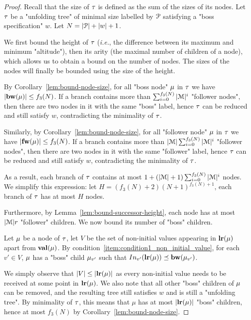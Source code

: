 \begin{proof}
	Recall that the size of $\tau$ is defined as the sum of the sizes of its nodes. 
	Let $\tau$ be a "unfolding tree" of minimal size labelled by $\mathcal{P}$ satisfying a "boss specification" $w$. Let $N = |\mathcal{P}| + |w|+1$.
	
	We first bound the height of $\tau$ (\emph{i.e.}, the difference between its maximum and minimum "altitude"), then its arity (the maximal number of children of a node), which allows us to obtain a bound on the number of nodes. The sizes of the nodes will finally be bounded using the size of the height. 
	
	By Corollary~\ref{lem:bound-node-size}, for all "boss node" $\mu$ in $\tau$ we have $|\mathbf{bw}(\mu)| \leq f_3(N)$.
	If a branch contains more than $\sum_{i=0}^{f_3(N)}|\mathcal{M}|^{i}$ "follower nodes", then there are two nodes in it with the same "boss" label, hence $\tau$ can be reduced and still satisfy $w$, contradicting the minimality of $\tau$.
	
	Similarly, by Corollary~\ref{lem:bound-node-size}, for all "follower node" $\mu$ in $\tau$ we have $|\mathbf{fw}(\mu)| \leq f_3(N)$.
	If a branch contains more than $|\mathcal{M}|\sum_{i=0}^{f_3(N)}|\mathcal{M}|^{i}$ "follower nodes", then there are two nodes in it with the same "follower" label, hence $\tau$ can be reduced and still satisfy $w$, contradicting the minimality of $\tau$.
	
	As a result, each branch of $\tau$ contains at most $1+ (|\mathcal{M}|+1) \sum_{i=0}^{f_3(N)}|\mathcal{M}|^{i}$ nodes. We simplify this expression: let $H = (f_3(N)+2)(N+1)^{f_3(N)+1}$, each branch of $\tau$ has at most $H$ nodes.
	
	Furthermore, by Lemma~\ref{lem:bound-successor-height}, each node has at most $|\mathcal{M}|r$ "follower" children. We now bound its number of "boss" children.
	
	Let $\mu$ be a node of $\tau$, let $V$ be the set of non-initial values appearing in $\mathbf{lr}(\mu)$ apart from $\mathbf{val}(\mu)$.
	By condition~\ref{item:condition1_non_initial_value}, for each $v' \in V$, $\mu$ has a "boss" child $\mu_{v'}$ such that $\vinput{v'}{\localrunlabel{\node}} \subword \bosslabel{\node_{v'}}$.
	
	We simply observe that $|V| \leq |\mathbf{lr}(\mu)|$ as every non-initial value needs to be received at some point in $\mathbf{lr}(\mu)$. We also note that all other "boss" children of $\mu$ can be removed, and the resulting tree still satisfies $w$ and is still a "unfolding tree". By minimality of $\tau$, this means that $\mu$ has at most $|\mathbf{lr}(\mu)|$ "boss" children, hence at most $f_3(N)$ by Corollary~\ref{lem:bound-node-size}.
	

\end{proof}
